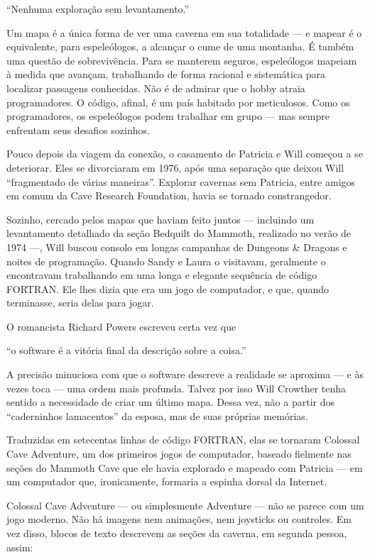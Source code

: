 \documentclass[12pt,a4paper]{article}
\begin{document}
“Nenhuma exploração sem levantamento.”

Um mapa é a única forma de ver uma caverna em sua totalidade — e mapear é o equivalente, para espeleólogos, a alcançar o cume de uma montanha.
É também uma questão de sobrevivência.
Para se manterem seguros, espeleólogos mapeiam à medida que avançam, trabalhando de forma racional e sistemática para localizar passagens conhecidas.
Não é de admirar que o hobby atraia programadores.
O código, afinal, é um país habitado por meticulosos.
Como os programadores, os espeleólogos podem trabalhar em grupo — mas sempre enfrentam seus desafios sozinhos.

Pouco depois da viagem da conexão, o casamento de Patricia e Will começou a se deteriorar.
Eles se divorciaram em 1976, após uma separação que deixou Will “fragmentado de várias maneiras”.
Explorar cavernas sem Patricia, entre amigos em comum da Cave Research Foundation, havia se tornado constrangedor.

Sozinho, cercado pelos mapas que haviam feito juntos — incluindo um levantamento detalhado da seção Bedquilt do Mammoth, realizado no verão de 1974 —, Will buscou consolo em longas campanhas de Dungeons & Dragons e noites de programação.
Quando Sandy e Laura o visitavam, geralmente o encontravam trabalhando em uma longa e elegante sequência de código FORTRAN.
Ele lhes dizia que era um jogo de computador, e que, quando terminasse, seria delas para jogar.

O romancista Richard Powers escreveu certa vez que

“o software é a vitória final da descrição sobre a coisa.”

A precisão minuciosa com que o software descreve a realidade se aproxima — e às vezes toca — uma ordem mais profunda.
Talvez por isso Will Crowther tenha sentido a necessidade de criar um último mapa.
Dessa vez, não a partir dos “caderninhos lamacentos” da esposa, mas de suas próprias memórias.

Traduzidas em setecentas linhas de código FORTRAN, elas se tornaram Colossal Cave Adventure,
um dos primeiros jogos de computador, baseado fielmente nas seções do Mammoth Cave que ele havia explorado e mapeado com Patricia —
em um computador que, ironicamente, formaria a espinha dorsal da Internet.

Colossal Cave Adventure — ou simplesmente Adventure —
não se parece com um jogo moderno.
Não há imagens nem animações, nem joysticks ou controles.
Em vez disso, blocos de texto descrevem as seções da caverna, em segunda pessoa, assim:
\end{document}
